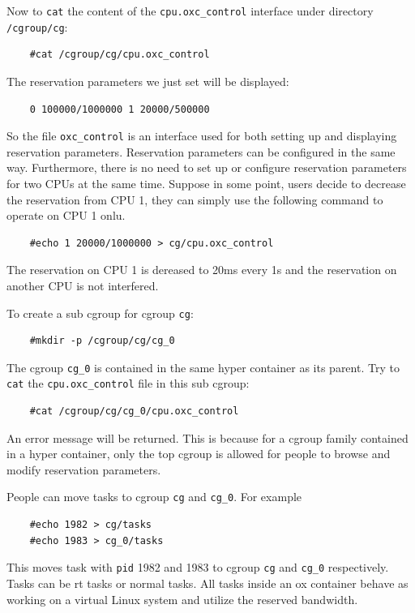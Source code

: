 Now to \texttt{cat} the content of the \texttt{cpu.oxc\_control} interface 
under directory \texttt{/cgroup/cg}:
\begin{lstlisting}
	#cat /cgroup/cg/cpu.oxc_control
\end{lstlisting}
The reservation parameters we just set will be displayed:
\begin{lstlisting}
	0 100000/1000000 1 20000/500000
\end{lstlisting}
So the file \texttt{oxc\_control} is an interface used for both setting up
and displaying reservation parameters. 
Reservation parameters can be configured in the same way. Furthermore,
there is no need to set up or configure reservation parameters for two 
CPUs at the same time. Suppose in some point, users decide to decrease 
the reservation from CPU 1, they can simply use the following command to
operate on CPU 1 onlu.
\begin{lstlisting}
	#echo 1 20000/1000000 > cg/cpu.oxc_control
\end{lstlisting}
The reservation on CPU 1 is dereased to 20ms every 1s and the reservation
on another CPU is not interfered. 

To create a sub cgroup for cgroup \texttt{cg}:
\begin{lstlisting}
	#mkdir -p /cgroup/cg/cg_0
\end{lstlisting}
The cgroup \texttt{cg\_0} is contained in the same hyper container as
its parent. Try to \texttt{cat} the \texttt{cpu.oxc\_control} file in 
this sub cgroup: 
\begin{lstlisting}
	#cat /cgroup/cg/cg_0/cpu.oxc_control
\end{lstlisting}
An error message will be returned. This is because for a cgroup family
contained in a hyper container, only the top cgroup is allowed for people
to browse and modify reservation parameters.

People can move tasks to cgroup \texttt{cg} and \texttt{cg\_0}. For example
\begin{lstlisting}
	#echo 1982 > cg/tasks
	#echo 1983 > cg_0/tasks
\end{lstlisting}
This moves task with \texttt{pid} 1982 and 1983 to cgroup \texttt{cg} and
\texttt{cg\_0} respectively. Tasks can be rt tasks or normal tasks. All 
tasks inside an ox container behave as working on a virtual Linux system
and utilize the reserved bandwidth.

